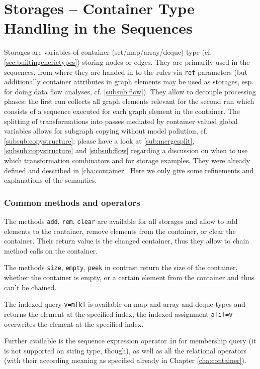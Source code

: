 \section{Storages -- Container Type Handling in the Sequences}\label{sec:storages}
Storages are variables of container (set/map/array/deque) type (cf. \ref{sec:builtingenerictypes}) storing nodes or edges.
They are primarily used in the sequences, from where they are handed in to the rules via \texttt{ref} parameters (but additionally container attributes in graph elements may be used as storages,
esp. for doing data flow analyses, cf. \ref{subsub:flow}).
They allow to decouple processing phases: the first run collects all graph elements relevant for the second run which consists of a sequence executed for each graph element in the container.
The splitting of transformations into passes mediated by container valued global variables allows for subgraph copying without model pollution, cf. \ref{subsub:copystructure}; please have a look at \ref{sub:mergesplit}, \ref{subsub:copystructure} and \ref{subsub:flow} regarding a discussion on when to use which transformation combinators and for storage examples.
They were already defined and described in \ref{cha:container}.
Here we only give some refinements and explanations of the semantics.

\subsubsection*{Common methods and operators}

The methods \texttt{add}, \texttt{rem}, \texttt{clear} are available for all storages and allow to add elements to the container, remove elements from the container, or clear the container.
Their return value is the changed container, thus they allow to chain method calls on the container.

The methods \texttt{size}, \texttt{empty}, \texttt{peek} in contrast return the size of the container, whether the container is empty, or a certain element from the container and thus can't be chained.

The indexed query \texttt{v=m[k]} is available on map and array and deque types and returns the element at the specified index,
the indexed assignment \texttt{a[i]=v} overwrites the element at the specified index.

Further available is the sequence expression operator \texttt{in} for membership query (it is not supported on string type, though), as well as all the relational operators (with their according meaning as specified already in Chapter \ref{cha:container}).

